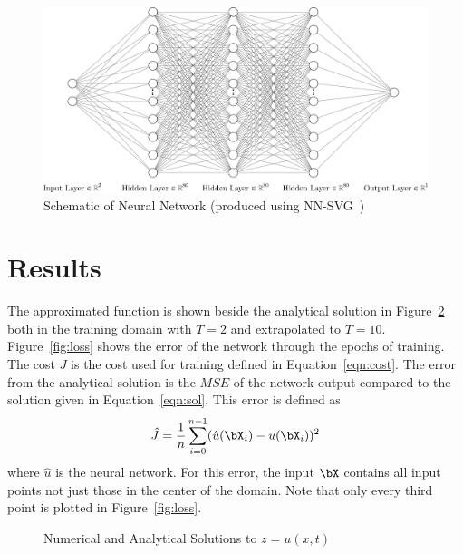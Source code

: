 \documentclass{article}
\def\model{may6}
\begin{document}
      \begin{figure}[!htbp]
        \centering
        \caption{Schematic of Neural Network (produced using NN-SVG~\cite{schematic})} \label{fig:network}
        \includegraphics[width=0.9\linewidth]{figures/nn.png}
      \end{figure}
  \section{Results}
    The approximated function is shown beside the analytical solution in Figure~\ref{fig:plot} both in the training domain with $T=2$ and extrapolated to $T=10$. Figure~\ref{fig:loss} shows the error of the network through the epochs of training. The cost $J$ is the cost used for training defined in Equation~\ref{eqn:cost}. The error from the analytical solution is the $MSE$ of the network output compared to the solution given in Equation~\ref{eqn:sol}. This error is defined as
    \begin{equation}
      \hat{J} = \frac1n \sum_{i=0}^{n-1} (\hat{u}(\bX_i) - u(\bX_i))^2
    \end{equation}
    where $\hat{u}$ is the neural network. For this error, the input $\bX$ contains all input points not just those in the center of the domain. Note that only every third point is plotted in Figure~\ref{fig:loss}.

    \begin{figure}[!htbp]
      \centering
      \caption{Numerical and Analytical Solutions to $z = u(x,t)$} \label{fig:plot}

    \end{figure}
\end{document}
